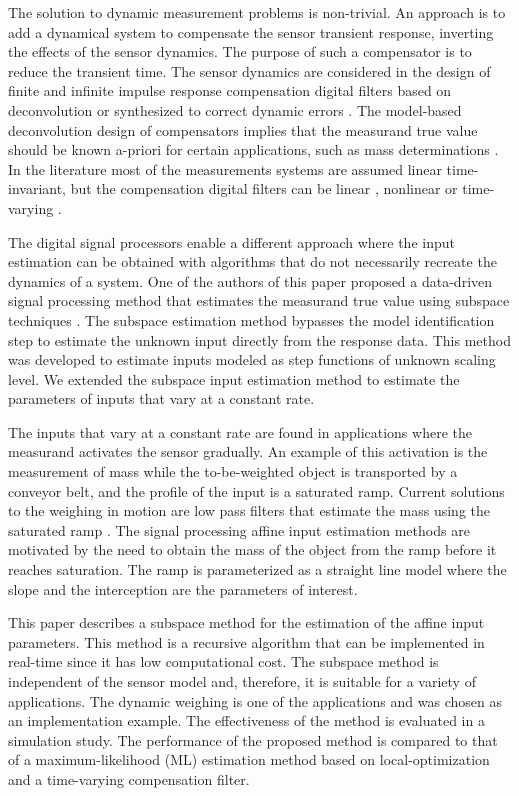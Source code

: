 The solution to dynamic measurement problems is non-trivial.
An approach is to add a dynamical system to compensate the sensor transient response, inverting the effects of the sensor dynamics.
The purpose of such a compensator is to reduce the transient time.
The sensor dynamics are considered in the design of finite and infinite impulse response compensation digital filters based on deconvolution \cite{Eichstadt10} or synthesized to correct dynamic errors \cite{Hessling08a}. 
The model-based deconvolution design of compensators implies that the measurand true value should be known a-priori for certain applications, such as mass determinations \cite{Boschetti13, Niedzwiecki16b}.
In the literature most of the measurements systems are assumed linear time-invariant, but the compensation digital filters can be linear \cite{Tasaki07},  nonlinear \cite{Shu93} or time-varying \cite{Pietrzak14}.

The digital signal processors enable a different approach where the input estimation can be obtained with algorithms that do not necessarily recreate the dynamics of a system.
One of the authors of this paper proposed a data-driven signal processing method that estimates the measurand true value using subspace techniques \cite{Markovsky15cep, Markovsky15ieee}.
The subspace estimation method bypasses the model identification step to estimate the unknown input directly from the response data.
This method was developed to estimate inputs modeled as step functions of unknown scaling level.
We extended the subspace input estimation method to estimate the parameters of inputs that vary at a constant rate.

The inputs that vary at a constant rate are found in applications where the measurand activates the sensor gradually. 
An example of this activation is the measurement of mass while the to-be-weighted object is transported by a conveyor belt, and the profile of the input is a saturated ramp.
Current solutions to the weighing in motion are low pass filters that estimate the mass using the saturated ramp \cite{Tasaki07, Pietrzak14}.
The signal processing affine input estimation methods are motivated by the need to obtain the mass of the object from the ramp before it reaches saturation.
The ramp is parameterized as a straight line model where the slope and the interception are the parameters of interest.

This paper describes a subspace method for the estimation of the affine input parameters.
This method is a recursive algorithm that can be implemented in real-time since it has low computational cost.
The subspace method is independent of the sensor model and, therefore, it is suitable for a variety of applications.
The dynamic weighing is one of the applications and was chosen as an implementation example.
The effectiveness of the method is evaluated in a simulation study.
The performance of the proposed method is compared to that of a maximum-likelihood (ML) estimation method based on local-optimization and a time-varying compensation filter.

